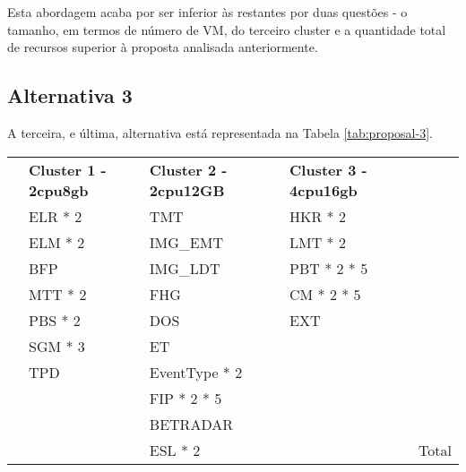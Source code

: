 Esta abordagem acaba por ser inferior às restantes por duas questões - o tamanho, em termos de número 
de \ac{VM}, do terceiro \gls{cluster} e a quantidade total de recursos superior à proposta
analisada anteriormente.

\subsection{Alternativa 3}

A terceira, e última, alternativa está representada na Tabela \ref{tab:proposal-3}.

\begin{table}[H]
  \centering
  \begin{tabular}{|l|l|l|l|l|}
    \hline
    \rowcolor[HTML]{FBE6A3} 
    \multicolumn{5}{|c|}{\textbf{Alternativa 3}} \\ \hline
    \rowcolor[HTML]{4EAC5B} 
    \cellcolor{white} & \textbf{Cluster 1 - 2cpu8gb} & \textbf{Cluster 2 - 2cpu12GB} & \textbf{Cluster 3 - 4cpu16gb} & \cellcolor{white} \\ \hline
    \cellcolor{white} & \cellcolor[HTML]{A9D08E} ELR * 2 & \cellcolor[HTML]{BDD7EE} TMT  & \cellcolor[HTML]{A9D08E} HKR * 2 & \cellcolor{white} \\ \hline
    \cellcolor{white} & \cellcolor[HTML]{A9D08E} ELM * 2 & \cellcolor[HTML]{BDD7EE} IMG\_EMT  & \cellcolor[HTML]{A9D08E} LMT * 2 & \cellcolor{white} \\ \hline
    \cellcolor{white} & \cellcolor[HTML]{A9D08E} BFP & \cellcolor[HTML]{BDD7EE} IMG\_LDT  & \cellcolor[HTML]{A9D08E} PBT * 2 * 5 & \cellcolor{white} \\ \hline
    \cellcolor{white} & \cellcolor[HTML]{BDD7EE} MTT * 2 & \cellcolor[HTML]{BDD7EE} FHG  & \cellcolor[HTML]{BDD7EE} CM * 2 * 5 & \cellcolor{white} \\ \hline
    \cellcolor{white} & \cellcolor[HTML]{BDD7EE} PBS * 2 & \cellcolor[HTML]{BDD7EE} DOS & \cellcolor[HTML]{BDD7EE} EXT  & \cellcolor{white} \\ \hline
    \cellcolor{white} & \cellcolor[HTML]{BDD7EE} SGM * 3 & \cellcolor[HTML]{BDD7EE} ET  & \cellcolor{white} & \cellcolor{white} \\ \hline
    \cellcolor{white} & \cellcolor[HTML]{BDD7EE} TPD & \cellcolor[HTML]{A9D08E} EventType * 2  & \cellcolor{white} & \cellcolor{white} \\ \hline
    \cellcolor{white} & \cellcolor{white} & \cellcolor[HTML]{A9D08E} FIP * 2 * 5 & \cellcolor{white} & \cellcolor{white} \\ \hline
    \cellcolor{white} & \cellcolor{white} & \cellcolor[HTML]{A9D08E} BETRADAR & \cellcolor{white} & \cellcolor{white} \\ \hline
    \cellcolor{white} & \cellcolor{white} & \cellcolor[HTML]{A9D08E} ESL * 2 & \cellcolor{white} & Total \cellcolor{white} \\ \hline


\end{tabular}
\end{table}
